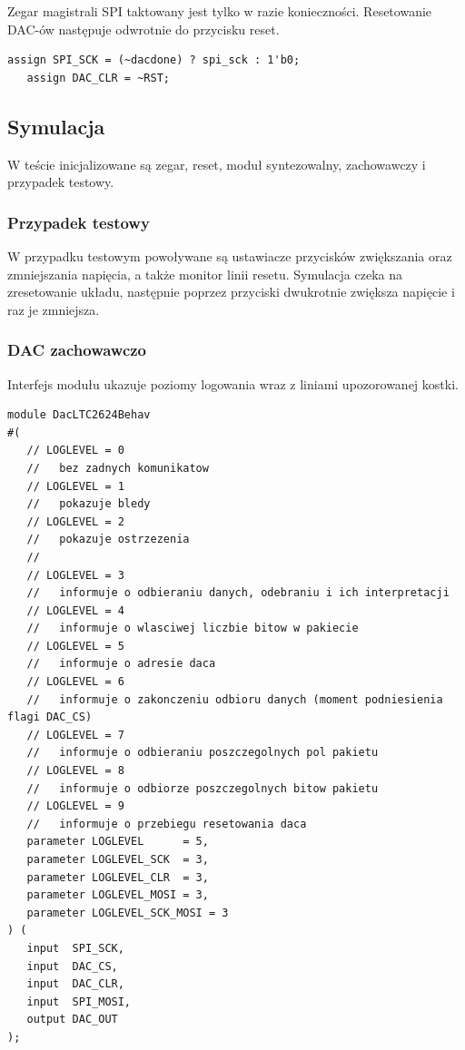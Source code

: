 \documentclass[a4paper,12pt]{article}
\begin{document}
Zegar magistrali SPI taktowany jest tylko w razie konieczności. Resetowanie DAC-ów następuje odwrotnie do przycisku reset.
\begin{lstlisting}[label=Controller,caption=Controller.v,firstnumber=51]
   assign SPI_SCK = (~dacdone) ? spi_sck : 1'b0;
   assign DAC_CLR = ~RST;
\end{lstlisting}


\subsection{Symulacja}

W teście inicjalizowane są zegar, reset, moduł syntezowalny, zachowawczy i przypadek testowy.

\subsubsection{Przypadek testowy}

W przypadku testowym powoływane są ustawiacze przycisków zwiększania oraz zmniejszania napięcia, a także monitor linii resetu. Symulacja czeka na zresetowanie układu, następnie poprzez przyciski dwukrotnie zwiększa napięcie i raz je zmniejsza.

\subsubsection{DAC zachowawczo}

Interfejs modułu ukazuje poziomy logowania wraz z liniami upozorowanej kostki.
\begin{lstlisting}[label=DacLTC2624Behav,caption=DacLTC2624Behav.v,firstnumber=0]
module DacLTC2624Behav
#(
   // LOGLEVEL = 0
   // 	bez zadnych komunikatow
   // LOGLEVEL = 1
   // 	pokazuje bledy
   // LOGLEVEL = 2
   // 	pokazuje ostrzezenia
   //
   // LOGLEVEL = 3
   // 	informuje o odbieraniu danych, odebraniu i ich interpretacji
   // LOGLEVEL = 4
   // 	informuje o wlasciwej liczbie bitow w pakiecie
   // LOGLEVEL = 5
   // 	informuje o adresie daca
   // LOGLEVEL = 6
   // 	informuje o zakonczeniu odbioru danych (moment podniesienia flagi DAC_CS)
   // LOGLEVEL = 7
   // 	informuje o odbieraniu poszczegolnych pol pakietu
   // LOGLEVEL = 8
   // 	informuje o odbiorze poszczegolnych bitow pakietu
   // LOGLEVEL = 9
   // 	informuje o przebiegu resetowania daca
   parameter LOGLEVEL      = 5,
   parameter LOGLEVEL_SCK  = 3,
   parameter LOGLEVEL_CLR  = 3,
   parameter LOGLEVEL_MOSI = 3,
   parameter LOGLEVEL_SCK_MOSI = 3
) (
   input  SPI_SCK,
   input  DAC_CS,
   input  DAC_CLR,
   input  SPI_MOSI,
   output DAC_OUT
);
\end{lstlisting}
\end{document}
